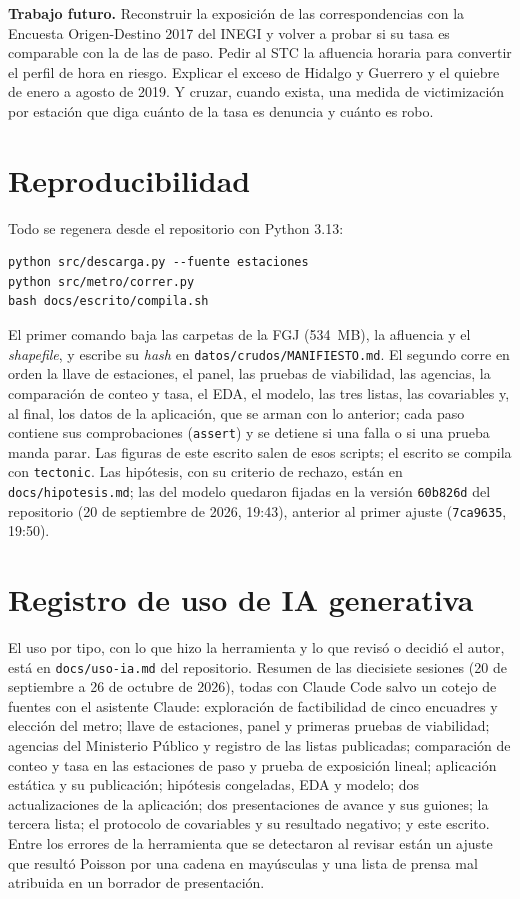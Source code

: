 \documentclass[conference]{IEEEtran}
\begin{document}
\textbf{Trabajo futuro.} Reconstruir la exposición de las correspondencias con la Encuesta Origen-Destino 2017 del INEGI y volver a probar si su tasa es comparable con la de las de paso. Pedir al STC la afluencia horaria para convertir el perfil de hora en riesgo. Explicar el exceso de Hidalgo y Guerrero y el quiebre de enero a agosto de 2019. Y cruzar, cuando exista, una medida de victimización por estación que diga cuánto de la tasa es denuncia y cuánto es robo.




\appendices

\section{Reproducibilidad}

Todo se regenera desde el repositorio \cite{repo_caso} con Python 3.13:
\begin{verbatim}
python src/descarga.py --fuente estaciones
python src/metro/correr.py
bash docs/escrito/compila.sh
\end{verbatim}
El primer comando baja las carpetas de la FGJ (534~MB), la afluencia y el \emph{shapefile}, y escribe su \emph{hash} en \texttt{datos/crudos/MANIFIESTO.md}. El segundo corre en orden la llave de estaciones, el panel, las pruebas de viabilidad, las agencias, la comparación de conteo y tasa, el EDA, el modelo, las tres listas, las covariables y, al final, los datos de la aplicación, que se arman con lo anterior; cada paso contiene sus comprobaciones (\texttt{assert}) y se detiene si una falla o si una prueba manda parar. Las figuras de este escrito salen de esos scripts; el escrito se compila con \texttt{tectonic}. Las hipótesis, con su criterio de rechazo, están en \texttt{docs/hipotesis.md}; las del modelo quedaron fijadas en la versión \texttt{60b826d} del repositorio (20 de septiembre de 2026, 19:43), anterior al primer ajuste (\texttt{7ca9635}, 19:50).

\section{Registro de uso de IA generativa}

El uso por tipo, con lo que hizo la herramienta y lo que revisó o decidió el autor, está en \texttt{docs/uso-ia.md} del repositorio. Resumen de las diecisiete sesiones (20 de septiembre a 26 de octubre de 2026), todas con Claude Code salvo un cotejo de fuentes con el asistente Claude: exploración de factibilidad de cinco encuadres y elección del metro; llave de estaciones, panel y primeras pruebas de viabilidad; agencias del Ministerio Público y registro de las listas publicadas; comparación de conteo y tasa en las estaciones de paso y prueba de exposición lineal; aplicación estática y su publicación; hipótesis congeladas, EDA y modelo; dos actualizaciones de la aplicación; dos presentaciones de avance y sus guiones; la tercera lista; el protocolo de covariables y su resultado negativo; y este escrito. Entre los errores de la herramienta que se detectaron al revisar están un ajuste que resultó Poisson por una cadena en mayúsculas y una lista de prensa mal atribuida en un borrador de presentación.
\end{document}
